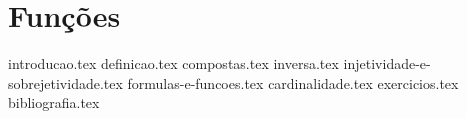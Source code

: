 \chapter{Funções}
{
    \newcommand{\chapterdir}{./sections/}
    
    {introducao.tex}
    {definicao.tex}
    {compostas.tex}
    {inversa.tex}
    {injetividade-e-sobrejetividade.tex}
    {formulas-e-funcoes.tex}
    {cardinalidade.tex}
    {exercicios.tex}
    {bibliografia.tex}
}